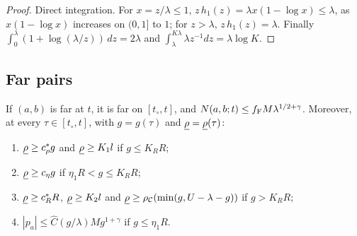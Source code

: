 \begin{proof}
Direct integration. For $x=z/\lambda\le1$, $z\,h_1(z)=\lambda x(1-\log x)\le\lambda$, as $x(1-\log x)$ increases on $(0,1]$ to $1$; for
$z>\lambda$, $z\,h_1(z)=\lambda$. Finally $\int_0^\lambda(1+\log(\lambda/z))\,dz=2\lambda$ and $\int_\lambda^{K\lambda}\lambda z^{-1}dz=\lambda\log K$.
\end{proof}

\subsection{Far pairs}

\begin{proposition}\label{prop:far}
If $(a,b)$ is far at $t$, it is far on $[t_\circ,t]$, and $N(a,b;t)\le f_{\mathrm F} M\lambda^{1/2+\gamma}$. Moreover, at every $\tau\in[t_\circ,t]$,
with $g=g(\tau)$ and $\underline\rho=\underline\rho(\tau)$:
\begin{enumerate}
\item[(i)] $\underline\rho\ge c_\rho^*g$ and $\underline\rho\ge K_1l$ if $g\le K_RR$;
\item[(ii)] $\underline\rho\ge c_\eta g$ if $\eta_1R<g\le K_RR$;
\item[(iii)] $\underline\rho\ge c_R^*R$, $\underline\rho\ge K_2l$ and $\underline\rho\ge\rho_{\mathcal C}(\min(g,U-\lambda-g))$ if $g>K_RR$;
\item[(iv)] $|p_a|\le\hat C(g/\lambda)Mg^{1+\gamma}$ if $g\le\eta_1R$.
\end{enumerate}
\end{proposition}

